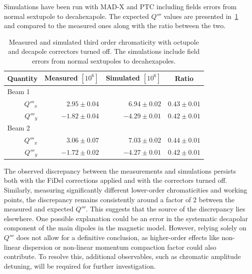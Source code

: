 Simulations have been run with MAD-X and PTC including fields errors from normal sextupole to 
decahexapole. The expected $Q'''$ values are presented
in~\cref{table:decapoles:bare_chromaticity:virgin_dq3} and compared to the measured ones along with
the ratio between the two.

\begin{table}[tbh]
    \centering
    \begin{tabular}{rrrc}
    \hline
        \toprule
        Quantity  &  Measured $[10^6]$        &  Simulated $[10^{6}]$          &   Ratio       \\
        \midrule
        \multicolumn{1}{l}{Beam 1}    &                           &                                &               \\
         $Q'''_x$ &     $ 2.95 \pm 0.04$      &       $ 6.94 \pm 0.02$         &  $0.43 \pm 0.01$\\
         $Q'''_y$ &     $-1.82 \pm 0.04$      &       $-4.29 \pm 0.01$         &  $0.42 \pm 0.01$\\
        \multicolumn{1}{l}{Beam 2}    &                           &                                &               \\
         $Q'''_x$ &     $ 3.06 \pm 0.07$      &       $ 7.03 \pm 0.02$         &  $0.44 \pm 0.01$\\
         $Q'''_y$ &     $-1.72 \pm 0.02$      &       $-4.27 \pm 0.01$         &  $0.42 \pm 0.01$\\
         \bottomrule
    \end{tabular}
    \caption{Measured and simulated third order chromaticity with octupole and decapole correctors
    turned off. The simulations include field errors from normal sextupoles to decahexapoles.}
    \label{table:decapoles:bare_chromaticity:virgin_dq3}
\end{table}

The observed discrepancy between the measurements and simulations persists both with the FiDel 
corrections applied and with the correctors turned off. Similarly, measuring significantly different 
lower-order chromaticities and working points, the discrepancy remains consistently around a factor 
of $2$ between the measured and expected $Q'''$. This suggests that the source of the discrepancy lies 
elsewhere. One possible explanation could be an error in the systematic decapolar component of the 
main dipoles in the magnetic model. However, relying solely on $Q'''$ does not allow for a definitive 
conclusion, as higher-order effects like non-linear dispersion or non-linear momentum compaction
factor could also contribute. To resolve this, additional observables, such as chromatic amplitude
detuning, will be required for further investigation.


\FloatBarrier
